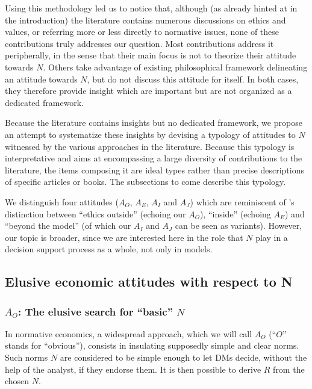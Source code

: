 \documentclass[preprint, french, english, 11pt, authoryear]{elsarticle}%
\newcommand{\protectforpdf}[1]{\texorpdfstring{\ensuremath{#1}}{#1}}
\newcommand{\possessivecite}[1]{\citeauthor{#1}’s \citeyearpar{#1}}
\begin{document}
\begin{changebar}
Using this methodology led us to notice that, although (as already hinted at in the introduction) the literature contains numerous discussions on ethics and values, or referring more or less directly to normative issues, 
none of these contributions truly addresses our question. 
Most contributions address it peripherally, in the sense that their main focus is not to theorize their attitude towards $N$. Others take advantage of existing philosophical framework delineating an attitude towards $N$, but do not discuss this attitude for itself.
In both cases, they therefore provide insight which are important but are not organized as a dedicated framework.

Because the literature contains insights but no dedicated framework, we propose an attempt to systematize these insights by devising a typology of attitudes to $N$ witnessed by the various approaches in the literature. 
Because this typology is interpretative and aims at encompassing a large diversity of contributions to the literature, the items composing it are ideal types rather than precise descriptions of specific articles or books.
 The subsections to come describe this typology. 
\end{changebar}We distinguish four attitudes ($A_O$, $A_E$, $A_I$ and $A_J$) which are reminiscent of \possessivecite{le_menestrel_ethics_2004} distinction between ``ethics outside'' (echoing our $A_O$), ``inside'' (echoing $A_E$) and ``beyond the model'' (of which our $A_I$ and $A_J$ can be seen as variants). 
 However, our topic is broader, since we are interested here in the role that $N$ play in a decision support process as a whole, not only in models.


\subsection{Elusive economic attitudes with respect to N}%
\subsubsection{\texorpdfstring{$A_O$}{AO}: The elusive search for ``basic'' \protectforpdf{N}}
In normative economics, a widespread approach, which we will call $A_O$ (``$O$'' stands for “obvious”), consists in insulating supposedly simple and clear norms. 
Such norms $N$ are considered to be simple enough to let \acp{DM} decide, without the help of the analyst, if they endorse them. It is then possible to derive $R$ from the chosen $N$.
\end{document}
